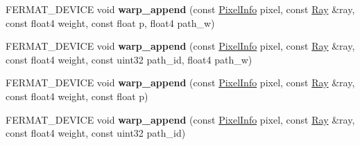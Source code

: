 \begin{DoxyCompactItemize}
\item 
\mbox{\label{struct_ray_queue_a82f55fe5142c62970ee6b6eceb66fe6c}} 
F\+E\+R\+M\+A\+T\+\_\+\+D\+E\+V\+I\+CE void {\bfseries warp\+\_\+append} (const \hyperlink{union_pixel_info}{Pixel\+Info} pixel, const \hyperlink{struct_ray}{Ray} \&ray, const float4 weight, const float p, float4 path\+\_\+w)
\item 
\mbox{\label{struct_ray_queue_a4226fba4c9df54b6f46d4b6c2b07c1c7}} 
F\+E\+R\+M\+A\+T\+\_\+\+D\+E\+V\+I\+CE void {\bfseries warp\+\_\+append} (const \hyperlink{union_pixel_info}{Pixel\+Info} pixel, const \hyperlink{struct_ray}{Ray} \&ray, const float4 weight, const uint32 path\+\_\+id, float4 path\+\_\+w)
\item 
\mbox{\label{struct_ray_queue_a6831e6ea2631003184d190c06c62c370}} 
F\+E\+R\+M\+A\+T\+\_\+\+D\+E\+V\+I\+CE void {\bfseries warp\+\_\+append} (const \hyperlink{union_pixel_info}{Pixel\+Info} pixel, const \hyperlink{struct_ray}{Ray} \&ray, const float4 weight, const float p)
\item 
\mbox{\label{struct_ray_queue_a97ce1f5e076558628b2d7a9f98d64b08}} 
F\+E\+R\+M\+A\+T\+\_\+\+D\+E\+V\+I\+CE void {\bfseries warp\+\_\+append} (const \hyperlink{union_pixel_info}{Pixel\+Info} pixel, const \hyperlink{struct_ray}{Ray} \&ray, const float4 weight, const uint32 path\+\_\+id)
\end{DoxyCompactItemize}
